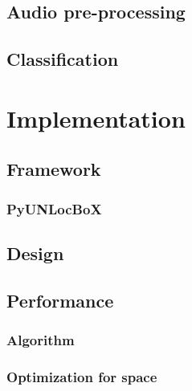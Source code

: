 \documentclass[a4paper,12pt,twoside]{report}
\begin{document}
\section{Audio pre-processing}

\section{Classification}

\chapter{Implementation}

\section{Framework}

\subsection{PyUNLocBoX}

\section{Design}

\section{Performance}

\subsection{Algorithm}

\subsection{Optimization for space}
\end{document}
